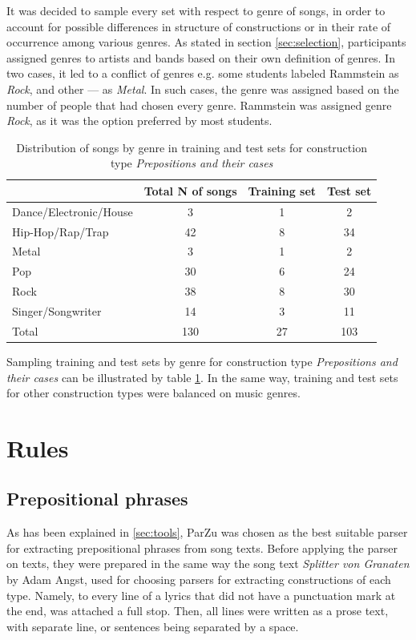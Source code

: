 It was decided to sample every set with respect to genre of songs, in order to account for possible differences in structure of constructions or in their rate of occurrence among various genres. As stated in section \ref{sec:selection}, participants assigned genres to artists and bands based on their own definition of genres. In two cases, it led to a conflict of genres e.g. some students labeled Rammstein as \textit{Rock}, and other --- as \textit{Metal}. In such cases, the genre was assigned based on the number of people that had chosen every genre. Rammstein was assigned genre \textit{Rock}, as it was the option preferred by most students.

\begin{table}[h!]
    \centering
    \begin{tabular}{l|c|c|c}
        & Total N of songs & Training set & Test set \\
        \hline
        Dance/Electronic/House & 3 & 1 & 2 \\
        Hip-Hop/Rap/Trap & 42 & 8 & 34 \\
        Metal & 3 & 1 & 2 \\
        Pop & 30 & 6 & 24 \\
        Rock & 38 & 8 & 30 \\
        Singer/Songwriter & 14 & 3 & 11 \\
        \hline
        Total & 130 & 27 & 103 \\
        \hline
    \end{tabular}
    \caption{Distribution of songs by genre in training and test sets for construction type \textit{Prepositions and their cases}}
    \label{table:genre-distribution}
\end{table}

Sampling training and test sets by genre for construction type \textit{Prepositions and their cases }can be illustrated by table \ref{table:genre-distribution}. In the same way, training and test sets for other construction types were balanced on music genres.

\section{Rules}

\subsection{Prepositional phrases}

As has been explained in \ref{sec:tools}, ParZu was chosen as the best suitable parser for extracting prepositional phrases from song texts. Before applying the parser on texts, they were prepared in the same way the song text \textit{Splitter von Granaten} by Adam Angst, used for choosing parsers for extracting constructions of each type. Namely, to every line of a lyrics that did not have a punctuation mark at the end, was attached a full stop. Then, all lines were written as a prose text, with separate line, or sentences being separated by a space. 


